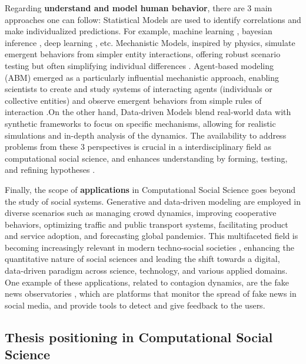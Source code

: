 Regarding  \textbf{understand and model human behavior}, there are 3 main approaches one can follow: Statistical Models are used to identify correlations and make individualized predictions. For example, machine learning \cite{murphy-2012}, bayesian inference \cite{gelman1995bayesian}, deep learning \cite{goodfellow-2016}, etc. Mechanistic Models, inspired by physics, simulate emergent behaviors from simpler entity interactions, offering robust scenario testing but often simplifying individual differences \cite{axelrod2006agent}. Agent-based modeling (ABM) emerged as a particularly influential mechanistic approach, enabling scientists to create and study systems of interacting agents (individuals or collective entities) and observe emergent behaviors from simple rules of interaction \cite{epstein1999agent}.On the other hand, Data-driven Models blend real-world data with synthetic frameworks to focus on specific mechanisms, allowing for realistic simulations and in-depth analysis of the dynamics. The availability to address problems from these 3 perspectives is crucial in a interdisciplinary field as computational social science, and enhances understanding by forming, testing, and refining hypotheses \cite{watts2004new}.

Finally, the scope of \textbf{applications} in Computational Social Science goes beyond the study of social systems. Generative and data-driven modeling are employed in diverse scenarios such as managing crowd dynamics, improving cooperative behaviors, optimizing traffic and public transport systems, facilitating product and service adoption, and forecasting global pandemics. This multifaceted field is becoming increasingly relevant in modern techno-social societies \cite{vespignani2009predicting}, enhancing the quantitative nature of social sciences and leading the shift towards a digital, data-driven paradigm across science, technology, and various applied domains. One example of these applications, related to contagion dynamics, are the fake news observatories \cite{Polis-observatory, EDMO-observatory, committed-observatory-2023}, which are platforms that monitor the spread of fake news in social media, and provide tools to detect and give feedback to the users.

\subsection{Thesis positioning in Computational Social Science\label{subsec:Thesis positioning in Computational Social Science}}

